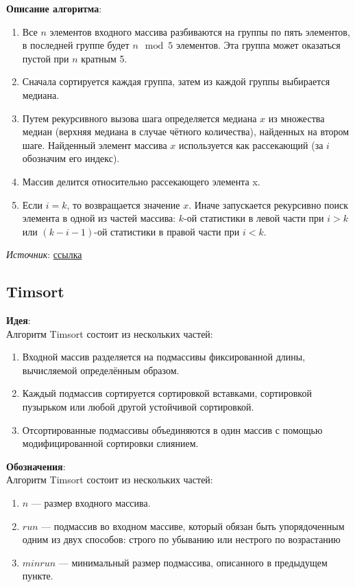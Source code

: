 \noindent\textbf{Описание алгоритма}:
\begin{enumerate}
    \item Все $n$ элементов входного массива разбиваются на группы по пять элементов, в последней группе будет $n \mod 5$ элементов. Эта группа может оказаться пустой при $n$ кратным 5.
    \item Сначала сортируется каждая группа, затем из каждой группы выбирается медиана.
	\item Путем рекурсивного вызова шага определяется медиана $x$ из множества медиан (верхняя медиана в случае чётного количества), найденных на втором шаге. Найденный элемент массива $x$ используется как рассекающий (за $i$ обозначим его индекс).
	\item Массив делится относительно рассекающего элемента x.
	\item Если $i = k$, то возвращается значение $x$. Иначе запускается рекурсивно поиск элемента в одной из частей массива: $k$-ой статистики в левой части при $i > k$ или $(k - i - 1)$-ой статистики в правой части при $i < k$.
\end{enumerate}

\noindent\textit{Источник}: \href{https://clck.ru/Scm7v}{ссылка}

\subsection{Timsort}
\noindent\textbf{Идея}:\\
Алгоритм Timsort состоит из нескольких частей: 
\begin{enumerate}
    \item Входной массив разделяется на подмассивы фиксированной длины, вычисляемой определённым образом.
    \item  Каждый подмассив сортируется сортировкой вставками, сортировкой пузырьком или любой другой устойчивой сортировкой.
    \item  Отсортированные подмассивы объединяются в один массив с помощью модифицированной сортировки слиянием.
\end{enumerate}


\noindent\textbf{Обозначения}:\\
Алгоритм Timsort состоит из нескольких частей: 
\begin{enumerate}
    \item $n$ — размер входного массива.
    \item $run$ — подмассив во входном массиве, который обязан быть упорядоченным одним из двух способов: строго по убыванию или нестрого по возрастанию
    \item $minrun$ — минимальный размер подмассива, описанного в предыдущем пункте.
\end{enumerate}


